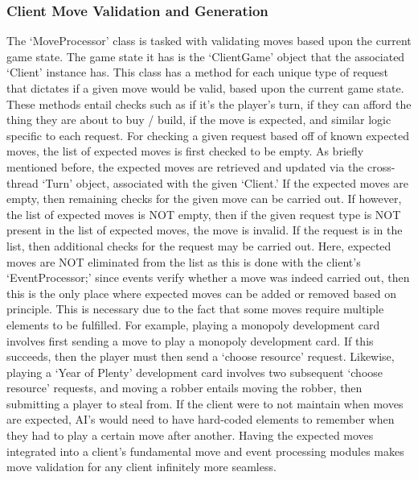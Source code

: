 \documentclass[a4paper,doc,draftfirst]{apa6}
\begin{document}
\subsubsection{Client Move Validation and Generation}
The ‘MoveProcessor’ class is tasked with validating moves based upon the current game state. The game state it has is the ‘ClientGame’ object that the associated ‘Client’ instance has. This class has a method for each unique type of request that dictates if a given move would be valid, based upon the current game state. These methods entail checks such as if it’s the player’s turn, if they can afford the thing they are about to buy / build, if the move is expected, and similar logic specific to each request. For checking a given request based off of known expected moves, the list of expected moves is first checked to be empty. As briefly mentioned before, the expected moves are retrieved and updated via the cross-thread ‘Turn’ object, associated with the given ‘Client.’ If the expected moves are empty, then remaining checks for the given move can be carried out. If however, the list of expected moves is NOT empty, then if the given request type is NOT present in the list of expected moves, the move is invalid. If the request is in the list, then additional checks for the request may be carried out. Here, expected moves are NOT eliminated from the list as this is done with the client’s ‘EventProcessor;’ since events verify whether a move was indeed carried out, then this is the only place where expected moves can be added or removed based on principle. This is necessary due to the fact that some moves require multiple elements to be fulfilled. For example, playing a monopoly development card involves first sending a move to play a monopoly development card. If this succeeds, then the player must then send a ‘choose resource’ request. Likewise, playing a ‘Year of Plenty’ development card involves two subsequent ‘choose resource’ requests, and moving a robber entails moving the robber, then submitting a player to steal from. If the client were to not maintain when moves are expected, AI’s would need to have hard-coded elements to remember when they had to play a certain move after another. Having the expected moves integrated into a client’s fundamental move and event processing modules makes move validation for any client infinitely more seamless.
\end{document}
